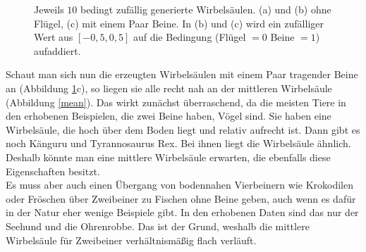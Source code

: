  \begin{figure}
  \qquad
  \qquad
  
  \caption{Jeweils $10$ bedingt zufällig generierte Wirbelsäulen. (a) und (b) ohne Flügel, (c) mit einem Paar Beine. In (b) und (c) wird ein zufälliger Wert aus $[-0{,}5, 0{,}5]$ auf die Bedingung (Flügel $= 0$ \bzw Beine $= 1$) aufaddiert.}
  \label{spine_variance}
 \end{figure}

 
 Schaut man sich nun die erzeugten Wirbelsäulen mit einem Paar tragender Beine an (Abbildung \ref{spine_variance}c), so liegen sie alle recht nah an der mittleren Wirbelsäule (Abbildung \ref{mean}).
 Das wirkt zunächst überraschend, da die meisten Tiere in den erhobenen Beispielen, die zwei Beine haben, Vögel sind. Sie haben eine Wirbelsäule, die hoch über dem Boden liegt und relativ aufrecht ist. Dann gibt es noch Känguru und Tyrannosaurus Rex. Bei ihnen liegt die Wirbelsäule ähnlich. Deshalb könnte man eine mittlere Wirbelsäule erwarten, die ebenfalls diese Eigenschaften besitzt.\\
 Es muss aber auch einen Übergang von bodennahen Vierbeinern wie Krokodilen oder Fröschen über Zweibeiner zu Fischen ohne Beine geben, auch wenn es dafür in der Natur eher wenige Beispiele gibt. In den erhobenen Daten sind das nur der Seehund und die Ohrenrobbe. Das ist der Grund, weshalb die mittlere Wirbelsäule für Zweibeiner verhältnismäßig flach verläuft.
 
